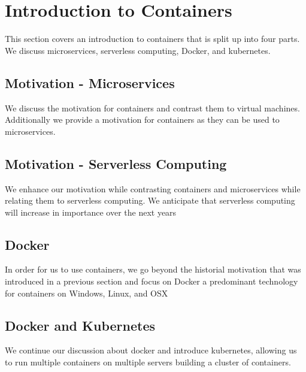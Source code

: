 \chapter{Introduction to Containers}
\label{c:container}

This section covers an introduction to containers that is split up into four parts. We discuss microservices, serverless computing, 
Docker, and kubernetes.

\section{Motivation - Microservices}
\label{s:motivation-microservices}

We discuss the motivation for containers and contrast them to virtual machines. Additionally we provide a motivation for containers as they can be used to microservices.


\section{Motivation - Serverless Computing}
\label{s:motivation-serverless}

We enhance our motivation while contrasting containers and microservices while relating them to serverless computing. We anticipate that serverless computing will increase in importance over the next years


\section{Docker}
\label{s:motivation-docker}

In order for us to use containers, we go beyond the historial motivation that was introduced in a previous section and focus on Docker a predominant technology for containers on Windows, Linux, and OSX


\section{Docker and Kubernetes}
\label{s:motivation-docker-kubernetes}

We continue our discussion about docker and introduce kubernetes, allowing us to run multiple containers on multiple servers building a cluster of containers.

